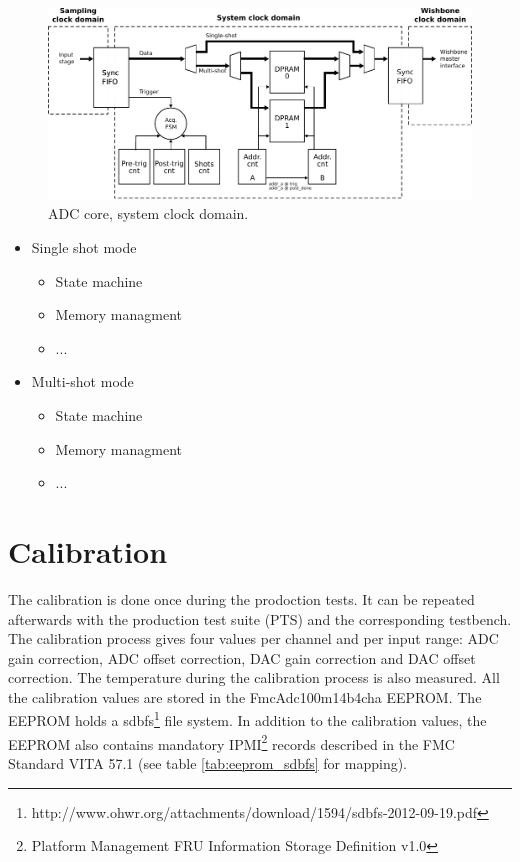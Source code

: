 \documentclass[11pt,a4paper]{article}
\begin{document}
\begin{figure}[h!]
  \includegraphics[width=\textwidth]{figures/adc_core_sys_clk.pdf}
  \caption{ADC core, system clock domain.}
  \label{fig:adc_core_sys_clk}
\end{figure}

\begin{itemize}

\item Single shot mode
  \begin{itemize}
  \item State machine
  \item Memory managment
  \item ...
  \end{itemize}

\item Multi-shot mode
  \begin{itemize}
  \item State machine
  \item Memory managment
  \item ...
  \end{itemize}
\end{itemize}




\newpage
\section{Calibration}

The calibration is done once during the prodoction tests.
It can be repeated afterwards with the production test suite (PTS) and the corresponding testbench.
The calibration process gives four values per channel and per input range:
ADC gain correction, ADC offset correction, DAC gain correction and DAC offset correction.
The temperature during the calibration process is also measured.
All the calibration values are stored in the FmcAdc100m14b4cha EEPROM.
The EEPROM holds a sdbfs\footnote{http://www.ohwr.org/attachments/download/1594/sdbfs-2012-09-19.pdf} file system.
In addition to the calibration values, the EEPROM also contains mandatory IPMI\footnote{Platform Management FRU Information Storage Definition v1.0} 
records described in the FMC Standard VITA 57.1 (see table \ref{tab:eeprom_sdbfs} for mapping).
\end{document}
